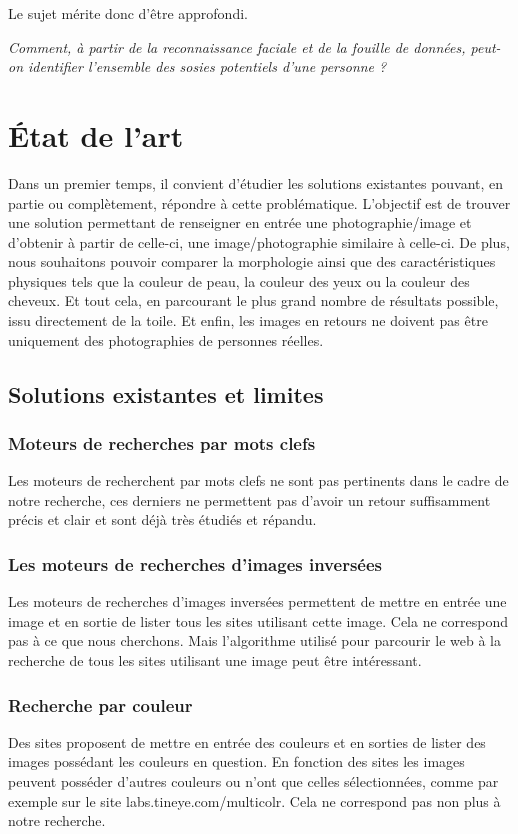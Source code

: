 \documentclass[a4paper,12pt]{article}
\begin{document}
Le sujet mérite donc d'être approfondi. 

\textit{Comment, à partir de la reconnaissance faciale et de la fouille de données, peut-on identifier l'ensemble des sosies potentiels d'une personne ? }
\section{État de l'art}
Dans un premier temps, il convient d'étudier les solutions existantes pouvant, en partie ou complètement, répondre à cette problématique. 
L'objectif est de trouver une solution permettant de renseigner en entrée une photographie/image et d'obtenir à partir de celle-ci, une image/photographie similaire à celle-ci. De plus, nous souhaitons pouvoir comparer la morphologie ainsi que des caractéristiques physiques tels que la couleur de peau, la couleur des yeux ou la couleur des cheveux. Et tout cela, en parcourant le plus grand nombre de résultats possible, issu directement de la toile. Et enfin, les images en retours ne doivent pas être uniquement des photographies de personnes réelles.

\subsection{Solutions existantes et limites}
\subsubsection{Moteurs de recherches par mots clefs}
Les moteurs de recherchent par mots clefs ne sont pas pertinents dans le cadre de notre recherche, ces derniers ne permettent pas d'avoir un retour suffisamment précis et clair et sont déjà très étudiés et répandu. 
\subsubsection{Les moteurs de recherches d'images inversées}
Les moteurs de recherches d'images inversées permettent de mettre en entrée une image et en sortie de lister tous les sites utilisant cette image. Cela ne correspond pas à ce que nous cherchons. Mais l'algorithme utilisé pour parcourir le web à la recherche de tous les sites utilisant une image peut être intéressant. 
\subsubsection{Recherche par couleur}
Des sites proposent de mettre en entrée des couleurs et en sorties de lister des images possédant les couleurs en question. En fonction des sites les images peuvent posséder d'autres couleurs ou n'ont que celles sélectionnées, comme par exemple sur le site labs.tineye.com/multicolr. Cela ne correspond pas non plus à notre recherche. 
\end{document}
